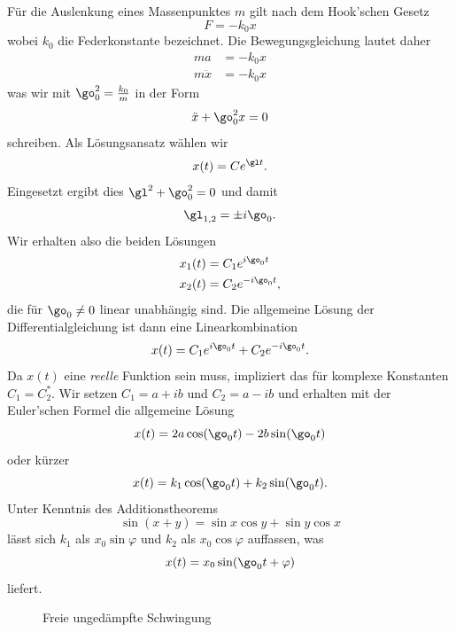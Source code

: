 \documentclass[%
11pt,%
twoside,%
titlepage,%
german,%
headsepline%
]{scrartcl}
\begin{document}
F\"ur
die Auslenkung eines Massenpunktes $m$ gilt nach dem Hook'schen Gesetz
$$F=-k_0x$$
wobei $k_0$ die Federkonstante bezeichnet. Die Bewegungsgleichung lautet daher
\begin{align*}
ma &= -k_0x\\
m\ddot{x} &= -k_0x
\end{align*}
was wir mit $\go_0^2=\frac{k_0}{m}$ in der Form
$$\ddot{x}+\go_0^2 x=0$$
schreiben. Als L\"osungsansatz w\"ahlen wir
$$x(t)=Ce^{\gl t}.$$
Eingesetzt ergibt dies $\gl^2+\go_0^2=0$ und damit
$$\gl_{1,2}=\pm i\go_0.$$
Wir erhalten also die beiden L\"osungen
\begin{align*}
x_1(t) &= C_1e^{i\go_0 t}\\
x_2(t) &= C_2e^{-i\go_0 t},
\end{align*}
die f\"ur $\go_0\neq0$ linear unabh\"angig sind. Die allgemeine L\"osung der Differentialgleichung ist dann eine Linearkombination
$$x(t)=C_1e^{i\go_0 t}+ C_2e^{-i\go_0 t}.$$
Da $x(t)$ eine \emph{reelle} Funktion sein muss, impliziert das f\"ur komplexe Konstanten $C_1=C_2^*$. Wir setzen $C_1=a+ib$ und $C_2=a-ib$ und erhalten mit der Euler'schen Formel die allgemeine L\"osung
$$x(t)=2a\cos(\go_0 t)-2b\sin(\go_0 t)$$
oder k\"urzer
$$x(t)=k_1\cos(\go_0 t)+k_2\sin(\go_0 t).$$
Unter Kenntnis des Additionstheorems
$$\sin(x+y)=\sin x\cos y+\sin y\cos x$$
l\"asst sich $k_1$ als $x_0\sin\varphi$ und $k_2$ als $x_0\cos\varphi$ auffassen, was
$$x(t)=x_0\sin(\go_0 t+\varphi)$$
liefert.

\begin{figure}
\begin{center}
\end{center}
\caption{Freie un\-ge\-d\"ampf\-te Schwingung}
\end{figure}
\end{document}
